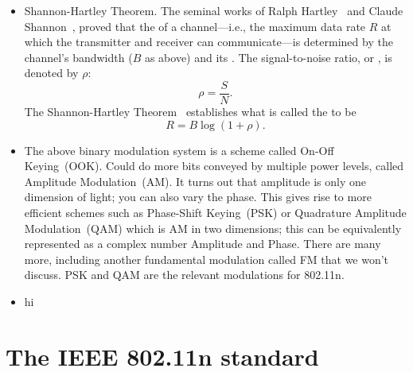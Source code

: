 \begin{itemize}
\item Shannon-Hartley Theorem. The seminal works of Ralph Hartley~\cite{Hartley_law} and Claude Shannon~\cite{Shannon_coding,Shannon_capacity}, proved that the  of a channel---i.e., the maximum data rate $R$ at which the transmitter and receiver can communicate---is determined by the channel's bandwidth ($B$ as above) and its . The signal-to-noise ratio, or , is denoted by $\rho$:
\begin{equation}
\rho = \frac{S}{N}.
\end{equation}
The Shannon-Hartley Theorem~\cite{Shannon_capacity} establishes what is called the  to be
\begin{equation}
R = B\log(1+\rho).
\end{equation}

\item The above binary modulation system is a scheme called On-Off Keying~(OOK). Could do more bits conveyed by multiple power levels, called Amplitude Modulation~(AM). It turns out that amplitude is only one dimension of light; you can also vary the phase. This gives rise to more efficient schemes such as Phase-Shift Keying~(PSK) or Quadrature Amplitude Modulation~(QAM) which is AM in two dimensions; this can be equivalently represented as a complex number Amplitude and Phase. There are many more, including another fundamental modulation called FM that we won't discuss. PSK and QAM are the relevant modulations for 802.11n.
\item hi
\end{itemize}


\section{The IEEE 802.11n standard}

\ifx\mainfile\undefined

\fi
